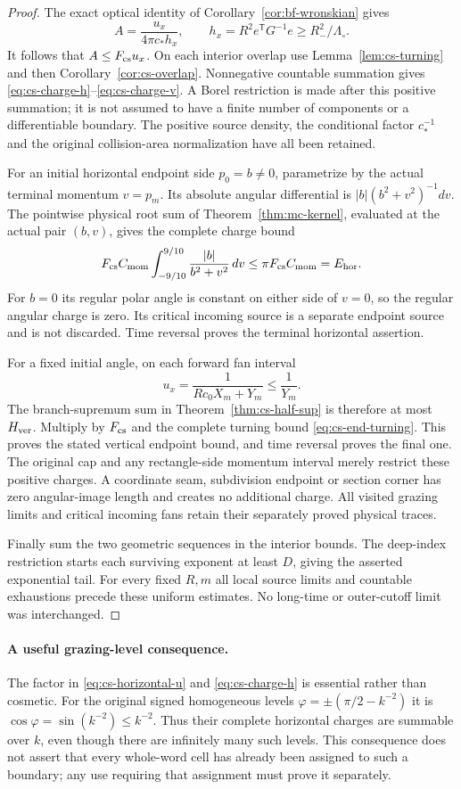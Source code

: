 \begin{proof}
The exact optical identity of Corollary~\ref{cor:bf-wronskian} gives
\[
 A=\frac{u_x}{4\pi c_*h_x},\qquad
 h_x=R^2e^{\mathsf T}G^{-1}e\ge R_-^2/\Lambda_\circ.
\]
It follows that $A\le F_{\rm cs}u_x$.
On each interior overlap use Lemma~\ref{lem:cs-turning} and then
Corollary~\ref{cor:cs-overlap}.  Nonnegative countable summation
gives \eqref{eq:cs-charge-h}--\eqref{eq:cs-charge-v}.  A Borel
restriction is made after this positive summation; it is not
assumed to have a finite number of components or a differentiable
boundary.  The positive source density, the conditional factor
$c_*^{-1}$ and the original collision-area normalization have all
been retained.

For an initial horizontal endpoint side $p_0=b\ne0$, parametrize
by the actual terminal momentum $v=p_m$.  Its absolute angular
differential is $|b|(b^2+v^2)^{-1}dv$.  The pointwise physical
root sum of Theorem~\ref{thm:mc-kernel}, evaluated at the actual
pair $(b,v)$, gives the complete charge bound
\[
 F_{\rm cs}C_{\rm mom}
       \int_{-9/10}^{9/10}\frac{|b|}{b^2+v^2}\,dv
                   \le\pi F_{\rm cs}C_{\rm mom}=E_{\rm hor}.
\]
For $b=0$ its regular polar angle is constant on either side of
$v=0$, so the regular angular charge is zero.  Its critical incoming
source is a separate endpoint source and is not discarded.
Time reversal proves the terminal horizontal assertion.

For a fixed initial angle, on each forward fan interval
\[
 u_x=\frac1{Rc_0X_m+Y_m}\le\frac1{Y_m}.
\]
The branch-supremum sum in Theorem~\ref{thm:cs-half-sup} is therefore
at most $H_{\rm ver}$.  Multiply by $F_{\rm cs}$ and the complete
turning bound \eqref{eq:cs-end-turning}.  This proves the stated
vertical endpoint bound, and time reversal proves the final one.
The original cap and any rectangle-side momentum interval merely
restrict these positive charges.  A coordinate seam, subdivision
endpoint or section corner has zero angular-image length and creates
no additional charge.  All visited grazing limits and critical
incoming fans retain their separately proved physical traces.

Finally sum the two geometric sequences in the interior bounds.
The deep-index restriction starts each surviving exponent at least
$D$, giving the asserted exponential tail.  For every fixed $R,m$
all local source limits and countable exhaustions precede these
uniform estimates.  No long-time or outer-cutoff limit was interchanged.
\end{proof}

\paragraph{A useful grazing-level consequence.}
The factor in \eqref{eq:cs-horizontal-u} and
\eqref{eq:cs-charge-h} is essential rather than cosmetic.
For the original signed homogeneous levels
$\varphi=\pm(\pi/2-k^{-2})$ it is
$\cos\varphi=\sin(k^{-2})\le k^{-2}$.  Thus their complete
horizontal charges are summable over $k$, even though there are
infinitely many such levels.  This consequence does not assert
that every whole-word cell has already been assigned to such a
boundary; any use requiring that assignment must prove it separately.
